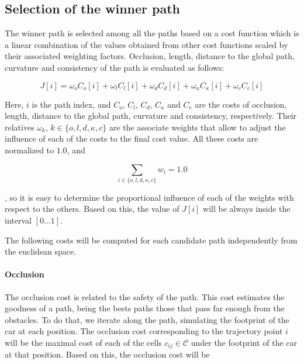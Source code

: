 \subsection{Selection of the winner path}\label{ch:chapter07_01_04}

The winner path is selected among all the paths based on a cost function which is a linear combination of the values obtained from other cost functions scaled by their associated weighting factors. Occlusion, length, distance to the global path, curvature and consistency of the path is evaluated as follows:

\begin{equation}\label{eq:cp07_cost_function}
J[i] = \omega_o C_o[i] + \omega_l C_l[i] + \omega_d C_d[i] + \omega_{\kappa} C_{\kappa}[i] + \omega_c C_c[i]
\end{equation}

Here, $i$ is the path index, and $C_o$, $C_l$, $C_d$, $C_{\kappa}$ and $C_c$ are the costs of occlusion, length, distance to the global path, curvature and consistency, respectively. Their relatives $\omega_k$, $k \in \{o, l, d, \kappa, c\}$ are the associate weights that allow to adjust the influence of each of the costs to the final cost value. All these costs are normalized to $1.0$, and 

\begin{equation}\label{eq:cp07_weights_sum}
\sum_{{i \in \{o, l, d, \kappa, c\}}} w_i= 1.0
\end{equation}

, so it is easy to determine the proportional influence of each of the weights with respect to the others. Based on this, the value of $J[i]$ will be always inside the interval $[0\dots1]$.

The following costs will be computed for each candidate path independently from the euclidean space.

\paragraph{Occlusion}\label{ch:chapter07_01_04_00_01}

The occlusion cost is related to the safety of the path. This cost estimates the goodness of a path, being the bests paths those that pass far enough from the obstacles. To do that, we iterate along the path, simulating the footprint of the car at each position. The occlusion cost corresponding to the trajectory point $i$ will be the maximal cost of each of the cells $c_{ij} \in \mathcal{C}$ under the footprint of the car at that position. Based on this, the occlusion cost will be

